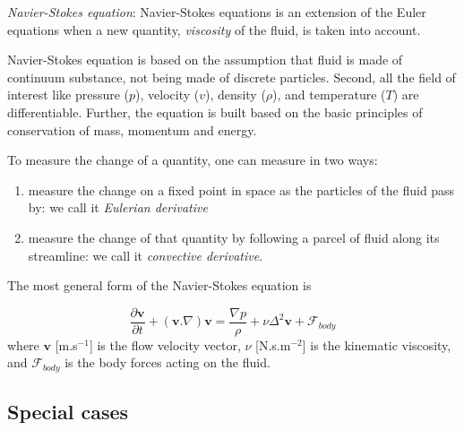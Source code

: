 {\it Navier-Stokes equation}: Navier-Stokes equations is an extension
of the Euler equations when a new quantity, {\it viscosity} of the
fluid, is taken into account.

Navier-Stokes equation is based on the assumption that fluid is made
of continuum substance, not being made of discrete particles. Second,
all the field of interest like pressure ($p$), velocity ($v$), density
($\rho$), and temperature ($T$) are differentiable.  Further, the
equation is built based on the basic principles of conservation of
mass, momentum and energy.

To measure the change of a quantity, one can measure in two ways:
\begin{enumerate}
\item measure the change on a fixed point in space as the particles of
  the fluid pass by: we call it {\it Eulerian derivative}

\item measure the change of that quantity by following a parcel of
  fluid along its streamline: we call it {\it convective derivative}.
\end{enumerate}

The most general form of the Navier-Stokes equation is

\begin{equation}
  \frac{\partial \mathbf{v}}{\partial t} + (\mathbf{v}. \nabla) \mathbf{v} = \frac{\nabla p}{\rho} + \nu \Delta^2\mathbf{v} + \mathcal{F}_{body}
\end{equation}
where $\mathbf{v}$ [m.s$^{-1}$] is the flow velocity vector, $\nu$
[N.s.m$^{-2}$] is the kinematic viscosity, and $\mathcal{F}_{body}$ is the body
forces acting on the fluid.

\subsection{Special cases}
\label{sec:special-cases}



